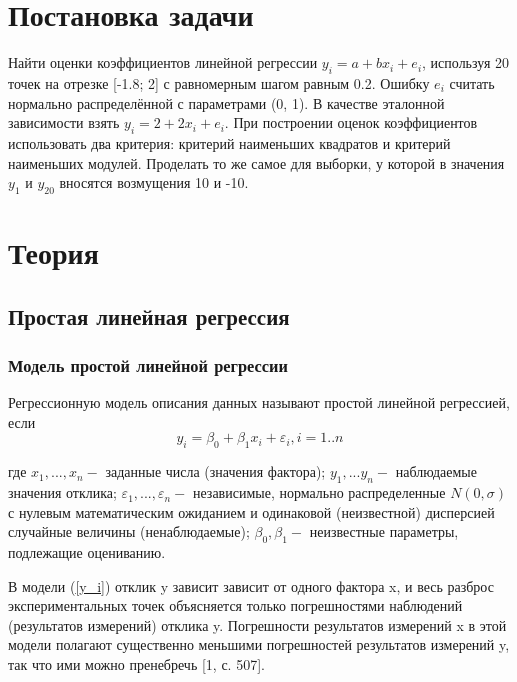 \documentclass[a4paper]{article}
\begin{document}
    
    \tableofcontents
    \newpage
	\listoffigures
    \newpage
	\section{Постановка задачи}
        \noindent Найти оценки коэффициентов линейной регрессии $y_{i} = a + bx_{i} + e_{i}$, используя 20 точек на отрезке [-1.8; 2] с равномерным шагом равным 0.2. Ошибку $e_{i}$ считать нормально распределённой с параметрами (0, 1). В качестве эталонной зависимости взять $y_{i} = 2 + 2x_{i} + e_{i}$. При построении оценок коэффициентов использовать два критерия: критерий наименьших квадратов и критерий наименьших модулей. Проделать то же самое для выборки, у которой в значения $y_{1}$ и $y_{20}$ вносятся возмущения 10 и -10.

    \section{Теория}
        \subsection{Простая линейная регрессия}
            \subsubsection{Модель простой линейной регрессии}
            \noindent Регрессионную модель описания данных называют простой линейной регрессией, если
            \begin{equation}
                y_{i} = \beta_{0} + \beta_{1}x_{i} + \varepsilon_{i},  i = 1..n
                \label{y_i}
            \end{equation}

            \noindent где $x_1,...,x_n - $ заданные числа (значения фактора);
            $y_1,...y_n - $ наблюдаемые значения отклика;
            $\varepsilon_1,...,\varepsilon_n - $ независимые, нормально распределенные $N(0, \sigma)$ с нулевым математическим ожиданием и одинаковой (неизвестной) дисперсией случайные величины (ненаблюдаемые);
            $\beta_0, \beta_1 - $ неизвестные параметры, подлежащие оцениванию.

            \noindent В модели (\ref{y_i}) отклик y зависит зависит от одного фактора x, и весь разброс экспериментальных точек объясняется только погрешностями наблюдений (результатов измерений) отклика y. Погрешности результатов измерений x в этой модели полагают существенно меньшими погрешностей результатов измерений y, так что ими можно пренебречь [1, с. 507].
\end{document}
